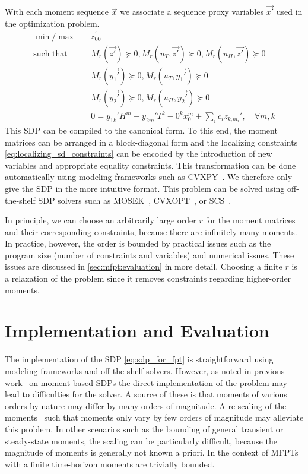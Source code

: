 With each moment sequence $\vec x$ we associate a sequence proxy variables $\vec{x'}$
used in the optimization problem.
\begin{equation}\label{eq:sdp_for_fpt}
    \begin{split}
        \min / \max \hspace{1em}&  z_{00}^{\prime} \\
        \text{such that}\hspace{1em} & M_r(\vec{z'})\succeq 0,
                   M_r({u}_T, \vec{z'})\succeq 0, M_r({u}_H, \vec{z'})\succeq 0\\
        & M_r(\vec{y_1'}) \succeq 0, M_r({u}_T,\vec{y_1'}) \succeq 0\\
        & M_r(\vec{y_2'}) \succeq 0, M_r({u}_H, \vec{y_2'}) \succeq 0\\
        & 0= y_{1k}' H^m -  y_{2m}'T^k - 0^k x_0^m +\sum_i c_i  z_{k_i m_i}', \quad\forall m, k
    \end{split}
\end{equation}
This \ac{SDP} can be compiled to the canonical form.
To this end, the moment matrices can be arranged in a block-diagonal form and the
localizing constraints \eqref{eq:localizing_sd_constraints} can be encoded
by the introduction of new variables and appropriate equality constraints.
This transformation can be done automatically using modeling frameworks
such as CVXPY~\cite{cvxpy}. We therefore only give the \ac{SDP} in the more intuitive format.
This problem can be solved using off-the-shelf \ac{SDP} solvers such as MOSEK~\cite{mosek},
CVXOPT~\cite{vandenberghe2010cvxopt}, or SCS~\cite{scs}.

In principle, we can choose an arbitrarily large order $r$ for the moment matrices
and their corresponding constraints, because there are
infinitely many moments.
In practice, however, the order is bounded by practical issues such as the program size
(number of constraints and variables) and numerical issues.
These issues are discussed in \autoref{sec:mfpt:evaluation} in more detail.
Choosing a finite $r$ is a relaxation of the problem since it removes constraints regarding
higher-order moments.


\section{Implementation and Evaluation}\label{sec:mfpt:evaluation}
The implementation of the \ac{SDP} \eqref{eq:sdp_for_fpt} is straightforward using
modeling frameworks and off-the-shelf solvers.
However, as noted in previous work~\cite{dowdy2018dynamic,sakurai2017convex,dowdy2018bounds,sakurai2019bounding} on moment-based \acp{SDP}
the direct implementation of the problem may lead to difficulties for the solver.
A source of these is that moments of various orders by nature
may differ by many orders of magnitude.
A re-scaling of the moments~\cite{dowdy2018bounds,sakurai2019bounding}
such that moments only vary by few orders of magnitude
may alleviate this problem.
In other scenarios such as the bounding of general transient or steady-state moments,
the scaling can be particularly difficult,
because the magnitude of moments is generally not known
a priori. In the context of \acp{MFPT} with a finite time-horizon
moments are trivially bounded.

